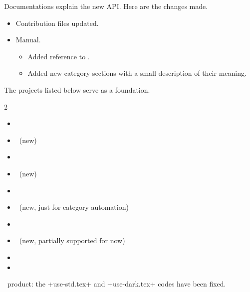 \documentclass{tutodoc}
\begin{document}
\begin{tdocupdate}
    \item Documentations explain the new API. Here are the changes made.
    \begin{itemize}
        \item Contribution  files updated.


        \item Manual.
        \begin{itemize}
            \item Added reference to \carbonplan.

            \item Added new category sections with a small description of their meaning.
        \end{itemize}
    \end{itemize}


    \item The projects listed below serve as a foundation.

    \bgroup
    \setlength{\multicolsep}{3pt}
    \begin{multicols}{2}
    \begin{itemize}
        \item \asymptote
        \item \carbonplan\      (new)
        \item \cartocolors
        \item \cmasher\         (new)
        \item {}
        \item {}\       (new, just for category automation)
        \item \matplotlib
        \item \nclcolortables\  (new, partially supported for now)
        \item \palettable
        \item \scicolmaps
    \end{itemize}
    \end{multicols}
    \egroup
\end{tdocupdate}

\tdocsep

\begin{tdocfix}[version = 1.3.0, date = 2026-01-01]
    \item \lua\ product: the +use-std.tex+ and +use-dark.tex+ codes have been fixed.
\end{tdocfix}
\end{document}
